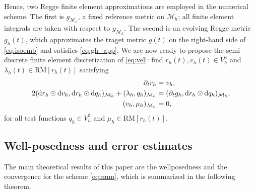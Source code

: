 \documentclass[11pt,a4paper,oneside,reqno]{amsart}
\theoremstyle{definition}
\theoremstyle{plain}
\newtheorem{theorem}{Theorem}
\numberwithin{theorem}{section}
\numberwithin{proposition}{section}
\numberwithin{lemma}{section}
\numberwithin{equation}{section}
\newcommand{\Man}{\mathcal{M}}
\newcommand{\RM}{\mathrm{RM}}
\begin{document}
Hence, two Regge finite element approximations are employed in the numerical scheme.
The first is \(g_{\Man_h}\), a fixed reference metric on \(\Man_h\); all finite element integrals are taken with respect to \(g_{\Man_h}\).
The second is an evolving Regge metric \(g_h(t)\), which approximates the traget metric \(g(t)\) on the right-hand side of \eqref{eq:isoemb} and satisfies \eqref{eq:gh_app}. 
We are now ready to propose the semi-discrete finite element discretization of \eqref{eq:vel}: find \(r_h(t), v_h(t)\in V_h^3\) and \(\lambda_h(t)\in \RM[r_h(t)]\) satisfying 
\begin{subequations}\label{eq:num}  
\begin{align}
    \hspace{-28mm}
\label{eq:num-v}    
\partial_t r_h &= v_h, \\    
\label{eq:num-a} 
2(\mathrm{d} r_h \odot \mathrm{d} v_h, \mathrm{d} r_h \odot \mathrm{d} q_h)_{\Man_h} 
+ (\lambda_h, q_h)_{\Man_h}  &= 
(\partial_t g_h, \mathrm{d} r_h \odot \mathrm{d} q_h)_{\Man_h}, \\ 
\label{eq:num-b} 
(v_h, \mu_h)_{\Man_h} &= 0,
\end{align}
\end{subequations}
for all test functions $q_h \in V_h^3$ and $\mu_h \in \RM[r_h(t)]$.


\subsection{Well-posedness and error estimates}

The main theoretical results of this paper are the wellposedness and the convergence for the scheme \eqref{eq:num}, which is summarized in the following theorem.



\end{document}
